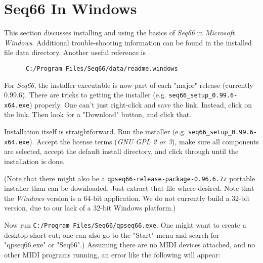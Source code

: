 %
%
%

\section{Seq66 In Windows}
\label{sec:windows}

   This section discusses installing and using the basics of \textsl{Seq66}
   in \textsl{Microsoft Windows}.  Additional trouble-shooting information can
   be found in the installed file data directory.
   Another useful reference is \cite{windowsmidi}.

   \begin{verbatim}
      C:/Program Files/Seq66/data/readme.windows
   \end{verbatim}

   For \textsl{Seq66}, the installer executable is now part of
   each "major" release (currently 0.99.6).
   There are tricks to getting the installer
   (e.g. \texttt{seq66\_setup\_0.99.6-x64.exe}) properly. 
   One can't just right-click and save the link.
   Instead, click on the link.  Then look for a "Download" button, and
   click that.

   Installation itself is straightforward.  Run the installer (e.g.
   \texttt{seq66\_setup\_0.99.6-x64.exe}).  Accept the license terms
   (\textsl{GNU GPL 2 or 3}),
   make sure all components are selected, accept the default
   install directory, and click through until the installation is done.

   (Note that there might also be a
   \texttt{qpseq66-release-package-0.96.6.7z} portable installer
   than can be downloaded.
   Just extract that file where desired.
   Note that the \textsl{Windows} version is a 64-bit
   application. We do not currently build a 32-bit version, due to
   our lack of a 32-bit Windows platform.)

   Now run 
   \texttt{C:/Program Files/Seq66/qpseq66.exe}.
   One might want to create a desktop short cut; one can also go to the
   "Start" menu and search for "qpseq66.exe" or "Seq66".)
   Assuming there are no MIDI devices attached, and no other MIDI programs
   running, an error like the following will appear:

